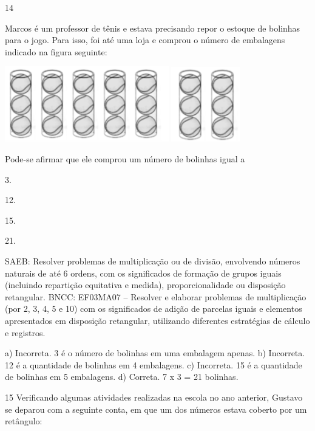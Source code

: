 {\begin{escolha}
{\num{14}

Marcos é um professor de tênis e estava precisando repor o estoque de bolinhas para o jogo. Para isso, foi até uma loja e comprou o número de embalagens indicado na figura seguinte:


\includegraphics[width=2.80882in,height=1.29243in]{media/image139.png}
\includegraphics[width=1.18628in,height=1.28713in]{media/image140.png}

Pode-se afirmar que ele comprou um número de bolinhas igual a

\begin{escolha}

\item
  3.
\item
  12.
\item
  15.
\item
  21.
\end{escolha}

SAEB: Resolver problemas de multiplicação ou de divisão, envolvendo números naturais de até 6 ordens, com os significados de formação de grupos iguais (incluindo repartição equitativa e medida), proporcionalidade ou disposição retangular.
BNCC: EF03MA07 – Resolver e elaborar problemas de multiplicação (por 2, 3, 4, 5 e 10) com os
significados de adição de parcelas iguais e elementos apresentados em disposição retangular,
utilizando diferentes estratégias de cálculo e registros.

a) Incorreta. 3 é o número de bolinhas em uma embalagem apenas.
b) Incorreta. 12 é a quantidade de bolinhas em 4 embalagens.
c) Incorreta. 15 é a quantidade de bolinhas em 5 embalagens.
d) Correta. 7 x 3 = 21 bolinhas.

\num{15} Verificando algumas atividades realizadas na escola no ano anterior, Gustavo se deparou com a seguinte conta, em que um dos números estava
coberto por um retângulo:

}
\end{escolha}}
